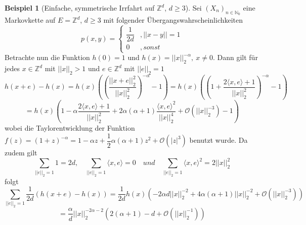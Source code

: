\documentclass[a4paper,12pt]{scrartcl}
\theoremstyle{definition}
\newtheorem{bsp}{Beispiel}[section]
\begin{document}
\begin{bsp}[Einfache, symmetrische Irrfahrt auf $\mathbb{Z}^{d}$, $d \geq 3$]
Sei $(X_{n})_{n \in \mathbb{N}_{0}}$ eine Markovkette auf $E = \mathbb{Z}^{d}$, $d \geq 3$ mit folgender Übergangswahrscheinlichkeiten
\begin{equation*}
p(x,y)=
\begin{cases}
\dfrac{1}{2d} & ,  \vert \vert x - y \vert \vert = 1\\
0 & , sonst
\end{cases}
\end{equation*}
Betrachte nun die Funktion $h(0)=1$ und $h(x)= {\vert \vert x \vert \vert}_{2}^{-\alpha}, \: x \neq 0$. Dann gilt für jedes $x \in \mathbb{Z}^{d}$ mit ${\vert \vert x \vert \vert}_{2} > 1$ und $e \in \mathbb{Z}^{d}$ mit ${\vert \vert e \vert \vert}_{2} = 1$
\begin{equation*}
h(x+e) - h(x) = h(x)\left(\left(\dfrac{{\vert \vert x + e \vert \vert}_{2}^{2}}{{\vert \vert x \vert \vert}_{2}^{2}}\right)^{-\alpha} - 1 \right) = h(x)\left(\left( 1 + \dfrac{{2\langle x,e \rangle + 1}}{{\vert \vert x \vert \vert}_{2}^{2}}\right)^{-\alpha} - 1 \right)
\end{equation*}
\begin{equation*}
 = h(x)\left(1 - \alpha \dfrac{{2\langle x,e \rangle + 1}}{{\vert \vert x \vert \vert}_{2}^{2} } + 2\alpha(\alpha + 1)\dfrac{{{\langle x,e \rangle}^{2}}}{{\vert \vert x \vert \vert}_{2}^{4} } + \mathcal{O}({\vert \vert x \vert \vert}_{2}^{-3}) - 1 \right)
\end{equation*}
wobei die Taylorentwicklung der Funktion $f(z)=(1+z)^{-\alpha}= 1 - \alpha z + \dfrac{1}{2} \alpha(\alpha +1)z^{2} + \mathcal{O}({\vert z \vert}^{3})$ benutzt wurde. Da zudem gilt
\begin{equation*}
\sum_{{\vert \vert e \vert \vert}_{2} = 1} 1 = 2d, \quad \sum_{{\vert \vert e \vert \vert}_{2} = 1} \langle x,e \rangle = 0 \quad und \quad \sum_{{\vert \vert e \vert \vert}_{2} = 1} {\langle x,e \rangle}^{2} = 2 {\vert \vert x \vert \vert}_{2}^{2}
\end{equation*}
folgt
\begin{equation*}
\sum_{{\vert \vert e \vert \vert}_{2} = 1} \dfrac{1}{2d} \left(h(x+e) - h(x)\right) = \dfrac{1}{2d}h(x)(-2 \alpha d {\vert \vert x \vert \vert}_{2}^{-2} + 4 \alpha (\alpha + 1){\vert \vert x \vert \vert}_{2}^{-2} + \mathcal{O}({\vert \vert x \vert \vert}_{2}^{-3}) )
\end{equation*}
\begin{equation*}
= \dfrac{\alpha}{d} {\vert \vert x \vert \vert}_{2}^{-2 \alpha - 2} (2(\alpha + 1) - d + \mathcal{O}({\vert \vert x \vert \vert}_{2}^{-1}))

\end{equation*}
\end{bsp}
\end{document}
